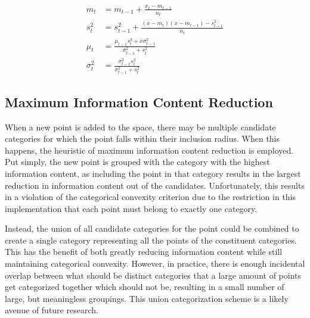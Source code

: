 \begin{align}
\label{equation:gaussian-posterior-update}
  m_t &= m_{t-1} + \frac{x_t - m_{t-1}}{n_t}
    \tag*{(Sample Mean)} \\
  s_t^2 &= s_{t-1}^2 + \frac{(x - m_t)(x - m_{t-1}) - s_{t-1}^2}{n_t}
    \tag*{(Sample Variance)} \\
    \mu_t &= \frac{\mu_{t-1} s_t^2 + x \sigma_{t-1}^2}{\sigma_{t-1}^2 + s_t^2}
    \tag*{(Posterior Mean)} \\
    \sigma_t^2 &= \frac{\sigma_{t-1}^2 s_t^2}{\sigma_{t-1}^2 + s_t^2}
    \tag*{(Posterior Variance)}
\end{align}

\subsection{Maximum Information Content Reduction}
\label{section:maximum-information-content-reduction}

When a new point is added to the space, there may be multiple candidate categories for which the point falls within their inclusion radius.  When this happens, the heuristic of maximum information content reduction is employed.  Put simply, the new point is grouped with the category with the highest information content, as including the point in that category results in the largest reduction in information content out of the candidates.  Unfortunately, this results in a violation of the categorical convexity criterion due to the restriction in this implementation that each point must belong to exactly one category.

Instead, the union of all candidate categories for the point could be combined to create a single category representing all the points of the constituent categories.  This has the benefit of both greatly reducing information content while still maintaining categorical convexity.  However, in practice, there is enough incidental overlap between what should be distinct categories that a large amount of points get categorized together which should not be, resulting in a small number of large, but meaningless groupings.  This union categorization scheme is a likely avenue of future research.
